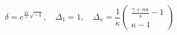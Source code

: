 \begin{equation}
\delta =e^{{\frac{2\pi}{s}}\sqrt{-1}},\,\,\,\,\,\,
\Delta_{1}=1,\,\,\,\,\,\,\Delta_{\kappa}=\frac{1}{\kappa}\left(\begin{array}{c}
\frac{\gamma +n \kappa}{s}-1\\
\kappa -1
\end{array}\right)
\end{equation}

